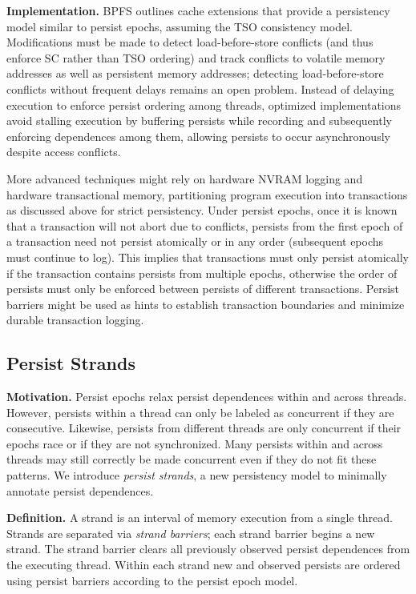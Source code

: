\textbf{Implementation.}
BPFS \cite{Condit09} outlines cache extensions that provide a persistency model similar to persist epochs, assuming the TSO consistency model.
Modifications must be made to detect load-before-store conflicts (and thus enforce SC rather than TSO ordering) and track conflicts to volatile memory addresses as well as persistent memory addresses; detecting load-before-store conflicts without frequent delays remains an open problem.
Instead of delaying execution to enforce persist ordering among threads, optimized implementations avoid stalling execution by buffering persists while recording and subsequently enforcing dependences among them, allowing persists to occur asynchronously despite access conflicts.

More advanced techniques might rely on hardware NVRAM logging and hardware transactional memory, partitioning program execution into transactions as discussed above for strict persistency.
Under persist epochs, once it is known that a transaction will not abort due to conflicts, persists from the first epoch of a transaction need not persist atomically or in any order (subsequent epochs must continue to log).
This implies that transactions must only persist atomically if the transaction contains persists from multiple epochs, otherwise the order of persists must only be enforced between persists of different transactions.
Persist barriers might be used as hints to establish transaction boundaries and minimize durable transaction logging.

\subsection{Persist Strands}
\label{section:PersistencyModels:PersistStrands}

\textbf{Motivation.}
Persist epochs relax persist dependences within and across threads.
However, persists within a thread can only be labeled as concurrent if they are consecutive.
Likewise, persists from different threads are only concurrent if their epochs race or if they are not synchronized.
Many persists within and across threads may still correctly be made concurrent even if they do not fit these patterns.
We introduce \emph{persist strands}, a new persistency model to minimally annotate persist dependences.

\textbf{Definition.}
A strand is an interval of memory execution from a single thread.
Strands are separated via \emph{strand barriers}; each strand barrier begins a new strand.
The strand barrier clears all previously observed persist dependences from the executing thread.
Within each strand new and observed persists are ordered using persist barriers according to the persist epoch model.

